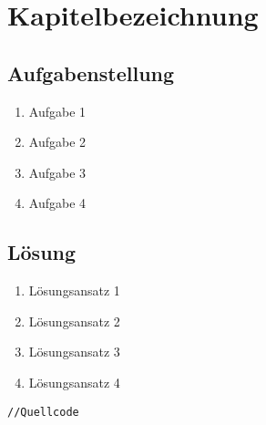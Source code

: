 \section{Kapitelbezeichnung}
\subsection{Aufgabenstellung}

\begin{enumerate}%
		\item Aufgabe 1
		\item Aufgabe 2
		\item Aufgabe 3
		\item Aufgabe 4
		
\end{enumerate}

\subsection{Lösung}
\begin{enumerate}
		\item Lösungsansatz 1
		\item Lösungsansatz 2
		\item Lösungsansatz 3
		\item Lösungsansatz 4
\end{enumerate}


\begin{lstlisting}[frame=htrbl, caption={Listening Bezeichnung}, label={lst:Referenzname}]
//Quellcode
\end{lstlisting}

